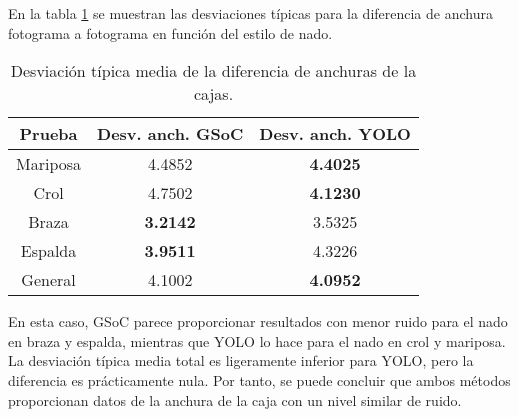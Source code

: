 En la tabla \ref{tab:desviacionesdiferenciasanchura} se muestran las desviaciones típicas para la diferencia de anchura fotograma a fotograma en función del estilo de nado. 

\begin{table}[]
    \centering
    \small
    \begin{tabular}{| c | c | c |   } \hline
        Prueba & Desv. anch. GSoC & Desv. anch. YOLO   \\ \hline
         Mariposa & 4.4852 & \textbf{4.4025} \\
         Crol & 4.7502 & \textbf{4.1230} \\
         Braza & \textbf{3.2142} & 3.5325   \\
         Espalda & \textbf{3.9511} & 4.3226 \\ 
         General & 4.1002 & \textbf{4.0952} \\ \hline
    \end{tabular}
    \caption{Desviación típica media de la diferencia de anchuras de la cajas.}
    \label{tab:desviacionesdiferenciasanchura}
\end{table}

En esta caso, GSoC parece proporcionar resultados con menor ruido para el nado en braza y espalda, mientras que YOLO lo hace para el nado en crol y mariposa. La desviación típica media total es ligeramente inferior para YOLO, pero la diferencia es prácticamente nula. Por tanto, se puede concluir que ambos métodos proporcionan datos de la anchura de la caja con un nivel similar de ruido.